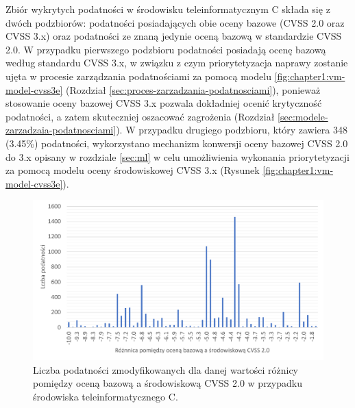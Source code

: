 Zbiór wykrytych podatności w środowisku teleinformatycznym C składa się z dwóch podzbiorów: podatności posiadających obie oceny bazowe (CVSS 2.0 oraz CVSS 3.x) oraz podatności ze znaną jedynie oceną bazową w standardzie CVSS 2.0. W przypadku pierwszego podzbioru podatności posiadają ocenę bazową według standardu CVSS 3.x, w związku z czym priorytetyzacja naprawy zostanie ujęta w procesie zarządzania podatnościami za pomocą modelu \ref{fig:chapter1:vm-model-cvss3e} (Rozdział \ref{sec:proces-zarzadzania-podatnosciami}), ponieważ stosowanie oceny bazowej CVSS 3.x pozwala dokładniej ocenić krytyczność podatności, a zatem skuteczniej oszacować zagrożenia (Rozdział \ref{sec:modele-zarzadzaia-podatnosciami}). W przypadku drugiego podzbioru, który zawiera 348 (3.45\%) podatności, wykorzystano mechanizm konwersji oceny bazowej CVSS 2.0 do 3.x opisany w rozdziale \ref{sec:ml} w celu umożliwienia wykonania priorytetyzacji za pomocą modelu oceny środowiskowej CVSS 3.x (Rysunek \ref{fig:chapter1:vm-model-cvss3e}). 

\begin{figure}[!ht]
\centering
\includegraphics[width=.9\textwidth]{Chapters/Eksperymenty/env_C_results/changes_cvss_2.pdf}
\caption{Liczba podatności zmodyfikowanych dla danej wartości różnicy pomiędzy oceną bazową a środowiskową CVSS 2.0 w przypadku środowiska teleinformatycznego C.}
\label{fig:chapter6:env_c:cvss_2_changes}
\end{figure}

